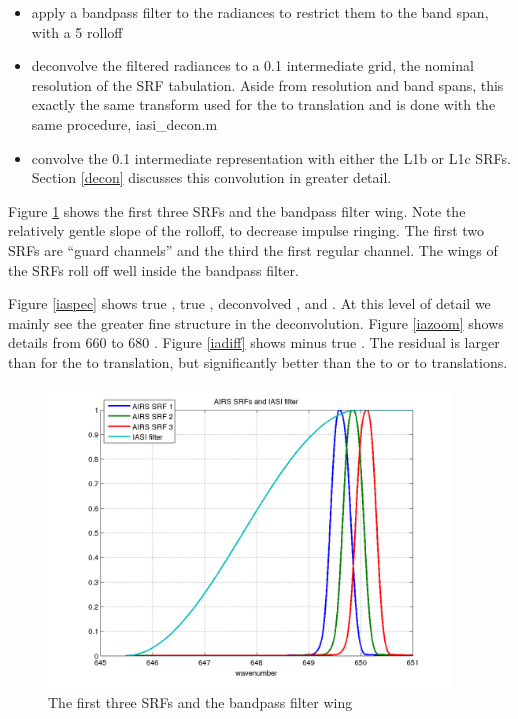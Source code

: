 \documentclass[12pt]{article}
\begin{document}

\begin{itemize}

  \item apply a bandpass filter to the {\iasi} radiances to restrict
    them to the {\airs} band span, with a 5 {\wn} rolloff

  \item deconvolve the filtered {\iasi} radiances to a 0.1 {\wn}
    intermediate grid, the nominal resolution of the {\airs} SRF
    tabulation.  Aside from resolution and band spans, this exactly
    the same transform used for the {\iasi} to {\cris} translation
    and is done with the same procedure, iasi\_decon.m

  \item convolve the 0.1 {\wn} intermediate representation with either
    the {\airs} L1b or L1c SRFs.  Section \ref{decon} discusses this
    convolution in greater detail.
    
\end{itemize}

Figure \ref{srfs1} shows the first three {\airs} SRFs and the
bandpass filter wing.  Note the relatively gentle slope of the
rolloff, to decrease impulse ringing.  The first two {\airs} SRFs
are ``guard channels'' and the third the first regular channel.  
The wings of the SRFs roll off well inside the bandpass filter.

Figure \ref{iaspec} shows true {\iasi}, true {\airs}, deconvolved
{\iasi}, and {\iasi} {\airs}.  At this level of detail we mainly see
the greater fine structure in the deconvolution.  Figure \ref{iazoom}
shows details from 660 to 680 {\wn}.  Figure \ref{iadiff} shows
{\iasi} {\airs} minus true {\airs}.  The residual is larger than for
the {\iasi} to {\cris} translation, but significantly better than
the {\airs} to {\cris} or {\cris} to {\airs} translations.

\begin{figure}
  \centering
  \includegraphics[height=8cm]{figures/srfs_and_filt.png}
  \caption{The first three {\airs} SRFs and the bandpass filter
    wing}
  \label{srfs1}
\end{figure}
\end{document}
